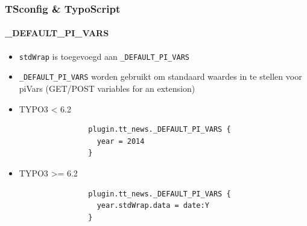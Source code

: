 
\begin{frame}[fragile]
	\frametitle{TSconfig \& TypoScript}
	\framesubtitle{\_DEFAULT\_PI\_VARS}

	\begin{itemize}
		\item \texttt{stdWrap} is toegevoegd aan \texttt{\_DEFAULT\_PI\_VARS}
		\item \texttt{\_DEFAULT\_PI\_VARS} worden gebruikt om standaard waardes in te stellen voor piVars (GET/POST variables for an extension)

		\item TYPO3 < 6.2
			\begin{lstlisting}
				plugin.tt_news._DEFAULT_PI_VARS {
				  year = 2014
				}
			\end{lstlisting}

		\item TYPO3 >= 6.2
			\begin{lstlisting}
				plugin.tt_news._DEFAULT_PI_VARS {
				  year.stdWrap.data = date:Y
				}
			\end{lstlisting}

	\end{itemize}

\end{frame}


